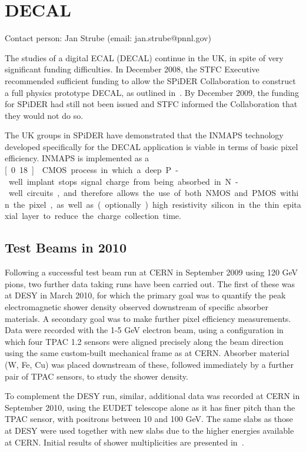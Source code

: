 \section{DECAL}
Contact person: Jan Strube (email: jan.strube@pnnl.gov)

The studies of a digital ECAL (DECAL) continue in the UK, in spite of very significant
funding difficulties. In December 2008, the STFC Executive recommended sufficient funding
to allow the SPiDER Collaboration to construct a full physics prototype DECAL, as outlined
in~\cite{Adloff:2010aa}. By December 2009, the funding for SPiDER had still not been issued and STFC
informed the Collaboration that they would not do so.

The UK groups in SPiDER have demonstrated that the INMAPS technology developed
specifically for the DECAL application is viable in terms of basic pixel efficiency. INMAPS is
implemented as a \unit[0.18]{\micron} CMOS process in which a deep P-well implant stops signal charge
from being absorbed in N-well circuits, and therefore allows the use of both NMOS and
PMOS within the pixel, as well as (optionally) high resistivity silicon in the thin epitaxial
layer to reduce the charge collection time.

\subsection{Test Beams in 2010}
Following a successful test beam run at CERN in September 2009 using 120 GeV pions, two
further data taking runs have been carried out. The first of these was at DESY in March
2010, for which the primary goal was to quantify the peak electromagnetic shower density
observed downstream of specific absorber materials. A secondary goal was to make further
pixel efficiency measurements. Data were recorded with the 1-5 GeV electron beam, using a
configuration in which four TPAC 1.2 sensors were aligned precisely along the beam direction
using the same custom-built mechanical frame as at CERN. Absorber material (W, Fe, Cu)
was placed downstream of these, followed immediately by a further pair of TPAC sensors, to
study the shower density.

To complement the DESY run, similar, additional data was recorded at CERN in September 2010, using the EUDET telescope alone as it has finer pitch than the TPAC sensor, with positrons between 10 and 100 GeV. The same slabs as those at DESY were used together with
new slabs due to the higher energies available at CERN. Initial results of shower multiplicities
are presented in~\cite{Price:2012vta}.

